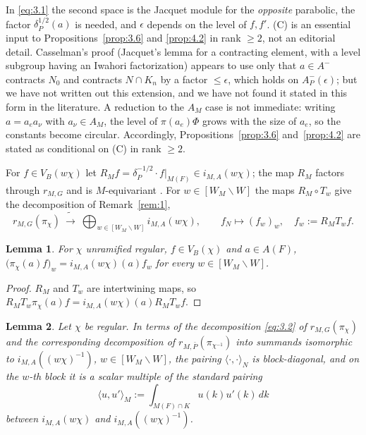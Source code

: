 \documentclass[12pt,letterpaper]{article}
\numberwithin{equation}{section}
\theoremstyle{plain}
\newtheorem{lemma}{Lemma}[section]
\theoremstyle{remark}
\theoremstyle{plain}
\theoremstyle{definition}
\theoremstyle{remark}
\newcounter{rtw}
\theoremstyle{remark}
\newcommand{\ip}[1]{\langle #1\rangle}
\newcommand{\Wrep}[1]{[W_{#1}\backslash W]}
\begin{document}
\begin{rem26}[\eqref{eq:3.1}]\label{r:cass}
In \eqref{eq:3.1} the second space is the Jacquet module for the \emph{opposite} parabolic, the factor $\delta_P^{1/2}(a)$ is needed, and $\epsilon$ depends on the level of $f,f'$. (C) is an essential input to Propositions~\ref{prop:3.6} and \ref{prop:4.2} in rank $\ge2$, not an editorial detail. Casselman's proof (Jacquet's lemma for a contracting element, with a level subgroup having an Iwahori factorization) appears to use only that $a\in A^-$ contracts $N_0$ and contracts $N\cap K_n$ by a factor $\le\epsilon$, which holds on $A^-_P(\epsilon)$; but we have not written out this extension, and we have not found it stated in this form in the literature. A reduction to the $A_M$ case is not immediate: writing $a=a_ea_\nu$ with $a_\nu\in A_M$, the level of $\pi(a_e)\Phi$ grows with the size of $a_e$, so the constants become circular. Accordingly, Propositions~\ref{prop:3.6} and~\ref{prop:4.2} are stated as conditional on (C) in rank $\ge2$.
\end{rem26}

For $f\in V_B(w\chi)$ let $R_Mf=\delta_P^{-1/2}\cdot f|_{M(F)}\in i_{M,A}(w\chi)$; the map $R_M$ factors through $r_{M,G}$ and is $M$-equivariant \cite[\S I]{Wa89a}. For $w\in\Wrep{M}$ the maps $R_M\circ T_w$ give the decomposition of Remark~\ref{rem:1},
\begin{equation}\label{eq:3.2}
r_{M,G}(\pi_\chi)\ \tilde\longrightarrow\ \bigoplus_{w\in\Wrep{M}}i_{M,A}(w\chi),\qquad f_N\longmapsto(f_w)_w,\quad f_w:=R_M T_wf.
\end{equation}

\begin{lemma}\label{lem:3.1}
For $\chi$ unramified regular, $f\in V_B(\chi)$ and $a\in A(F)$,
$\big(\pi_\chi(a)f\big)_w=i_{M,A}(w\chi)(a)f_w$ for every $w\in\Wrep{M}$.
\end{lemma}

\begin{proof}
$R_M$ and $T_w$ are intertwining maps, so $R_MT_w\pi_\chi(a)f=i_{M,A}(w\chi)(a)R_MT_wf$.
\end{proof}

\begin{lemma}\label{lem:3.2}
Let $\chi$ be regular. In terms of the decomposition \eqref{eq:3.2} of $r_{M,G}(\pi_\chi)$ and the corresponding decomposition of $r_{M,\bar P}(\pi_{\chi^{-1}})$ into summands isomorphic to $i_{M,A}((w\chi)^{-1})$, $w\in\Wrep{M}$, the pairing $\ip{\cdot,\cdot}_N$ is block-diagonal, and on the $w$-th block it is a scalar multiple of the standard pairing
\[
\ip{u,u'}_M:=\int_{M(F)\cap K}u(k)u'(k)\,dk
\]
between $i_{M,A}(w\chi)$ and $i_{M,A}((w\chi)^{-1})$.
\end{lemma}
\end{document}
